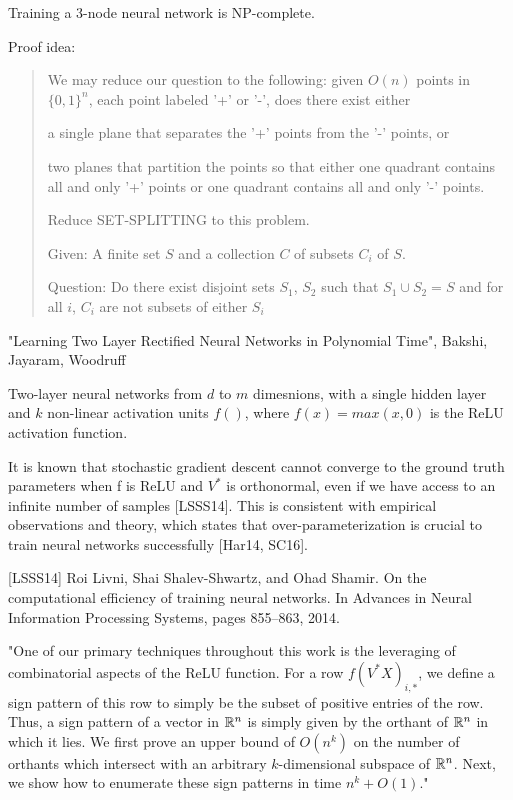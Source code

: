 \documentclass[english]{article}
\begin{document}
\begin{theorem} Training a 3-node neural network is NP-complete.
\end{theorem}
Proof idea: 

\begin{quote}
We may reduce our question to the following: given $O(n)$ points in $\{0, 1\}^n$,
each point labeled '+' or '-', does there exist either
\benum

\item a single plane that separates the '+' points from the '-' points, or

\item two planes that partition the points so that either one quadrant contains all and only '+' points or one quadrant contains all and only '-' points.


\eenum

Reduce SET-SPLITTING to this problem.

Given: A finite set $S$ and a collection $C$ of subsets $C_i$ of $S$.

Question: Do there exist disjoint sets $S_1$, $S_2$ such that $S_1 \cup S_2 = S$ and for all $i$, $C_i$ are not subsets of either $S_i$

\end{quote}


\item "Learning Two Layer Rectified Neural Networks in Polynomial Time", Bakshi, Jayaram, Woodruff 

Two-layer neural networks from $d$ to $m$ dimesnions, with a single  hidden layer and $k$ non-linear activation units $f()$, where $f(x) = max(x,0)$ is the ReLU activation function.

It is known that stochastic gradient descent cannot converge to the ground truth parameters when f is ReLU and $V^*$ is orthonormal, even if we have access to an infinite number of samples [LSSS14]. This is consistent with empirical observations and theory, which states that
over-parameterization is crucial to train neural networks successfully [Har14, SC16].

[LSSS14] Roi Livni, Shai Shalev-Shwartz, and Ohad Shamir. On the computational efficiency
of training neural networks. In Advances in Neural Information Processing Systems,
pages 855–863, 2014.

"One of our
primary techniques throughout this work is the leveraging of combinatorial aspects of the ReLU
function. For a row $f(V^* X)_{i,*}$, we define a sign pattern of this row to simply be the subset of
positive entries of the row. Thus, a sign pattern of a vector in $\mathbb{R}^n$ is simply given by the orthant
of $\mathbb{R}^n$ in which it lies. We first prove an upper bound of $O(n^k)$ on the number of orthants which
intersect with an arbitrary $k$-dimensional subspace of $\mathbb{R}^n$. Next, we show how to enumerate these
sign patterns in time $n^k+O(1)$."
\end{document}
